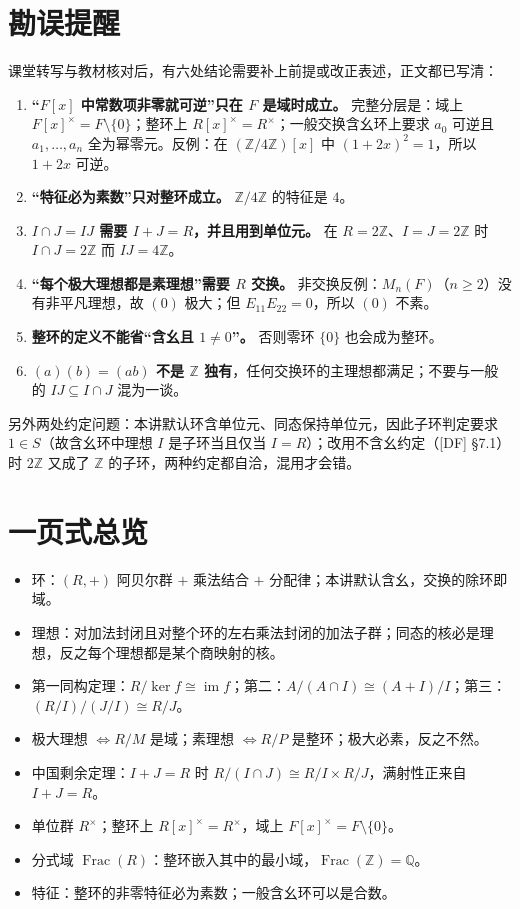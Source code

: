 \documentclass[UTF8,a4paper,11pt]{ctexart}
\begin{document}
\section*{勘误提醒}
课堂转写与教材核对后，有六处结论需要补上前提或改正表述，正文都已写清：
\begin{enumerate}
\item \textbf{“$F[x]$ 中常数项非零就可逆”只在 $F$ 是域时成立。} 完整分层是：域上 $F[x]^\times=F\setminus\{0\}$；整环上 $R[x]^\times=R^\times$；一般交换含幺环上要求 $a_0$ 可逆且 $a_1,\dots,a_n$ 全为幂零元。反例：在 $(\mathbb Z/4\mathbb Z)[x]$ 中 $(1+2x)^2=1$，所以 $1+2x$ 可逆。
\item \textbf{“特征必为素数”只对整环成立。} $\mathbb Z/4\mathbb Z$ 的特征是 $4$。
\item \textbf{$I\cap J=IJ$ 需要 $I+J=R$，并且用到单位元。} 在 $R=2\mathbb Z$、$I=J=2\mathbb Z$ 时 $I\cap J=2\mathbb Z$ 而 $IJ=4\mathbb Z$。
\item \textbf{“每个极大理想都是素理想”需要 $R$ 交换。} 非交换反例：$M_n(F)$（$n\ge2$）没有非平凡理想，故 $(0)$ 极大；但 $E_{11}E_{22}=0$，所以 $(0)$ 不素。
\item \textbf{整环的定义不能省“含幺且 $1\ne0$”。} 否则零环 $\{0\}$ 也会成为整环。
\item \textbf{$(a)(b)=(ab)$ 不是 $\mathbb Z$ 独有}，任何交换环的主理想都满足；不要与一般的 $IJ\subseteq I\cap J$ 混为一谈。
\end{enumerate}
另外两处约定问题：本讲默认环含单位元、同态保持单位元，因此子环判定要求 $1\in S$（故含幺环中理想 $I$ 是子环当且仅当 $I=R$）；改用不含幺约定（[DF] \S7.1）时 $2\mathbb Z$ 又成了 $\mathbb Z$ 的子环，两种约定都自洽，混用才会错。
\clearpage




\section*{一页式总览}
\begin{itemize}
\item 环：$(R,+)$ 阿贝尔群 $+$ 乘法结合 $+$ 分配律；本讲默认含幺，交换的除环即域。
\item 理想：对加法封闭且对整个环的左右乘法封闭的加法子群；同态的核必是理想，反之每个理想都是某个商映射的核。
\item 第一同构定理：$R/\ker f\cong\operatorname{im}f$；第二：$A/(A\cap I)\cong(A+I)/I$；第三：$(R/I)/(J/I)\cong R/J$。
\item 极大理想 $\iff R/M$ 是域；素理想 $\iff R/P$ 是整环；极大必素，反之不然。
\item 中国剩余定理：$I+J=R$ 时 $R/(I\cap J)\cong R/I\times R/J$，满射性正来自 $I+J=R$。
\item 单位群 $R^\times$；整环上 $R[x]^\times=R^\times$，域上 $F[x]^\times=F\setminus\{0\}$。
\item 分式域 $\operatorname{Frac}(R)$：整环嵌入其中的最小域，$\operatorname{Frac}(\mathbb Z)=\mathbb Q$。
\item 特征：整环的非零特征必为素数；一般含幺环可以是合数。
\end{itemize}
\end{document}
